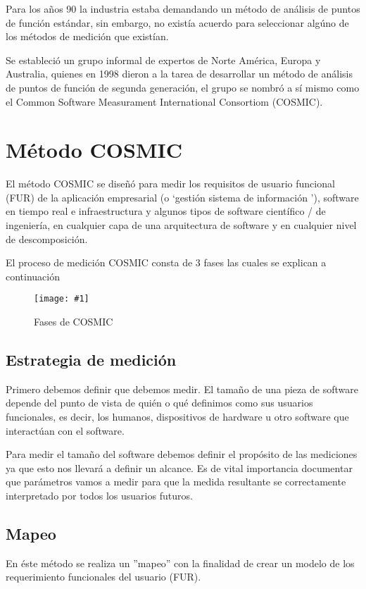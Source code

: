 \documentclass{mylib/reporteCorto}
\newcommand{\insertImage}[3]{
	\begin{figure}[H]
		\centering
		\texttt{[image: \#1]}
		\caption{#2}
	\end{figure}
}
\begin{document}
Para los años 90 la industria estaba demandando un método de análisis de puntos de función estándar, sin embargo, no existía acuerdo para seleccionar algúno de los métodos de medición que existían.

Se estableció un grupo informal de expertos de Norte América, Europa y Australia, quienes en 1998 dieron a la tarea de desarrollar un método de análisis de puntos de función de segunda generación, el grupo se nombró a sí mismo como el Common Software Measurament International Consortiom (COSMIC).

\section{Método COSMIC}

El método COSMIC se diseñó para medir los requisitos de usuario funcional (FUR) de la aplicación empresarial (o ‘gestión sistema de información '), software en tiempo real e infraestructura y algunos tipos de software científico / de ingeniería, en cualquier capa de una arquitectura de software y en cualquier nivel de descomposición.

El proceso de medición COSMIC consta de 3 fases las cuales se explican a continuación

\insertImage{img/admin/cosmic2}{Fases de COSMIC}{12}

\subsection{Estrategia de medición}

Primero debemos definir que debemos medir. El tamaño de una pieza de software depende del punto de vista de quién o qué definimos como sus usuarios funcionales, es decir, los humanos, dispositivos de hardware u otro software que interactúan con el software.

Para medir el tamaño del software debemos definir el propósito de las mediciones ya que esto nos llevará a definir un alcance. Es de vital importancia documentar que parámetros vamos a medir para que la medida resultante se correctamente interpretado por todos los usuarios futuros.

\subsection{Mapeo}

En éste método se realiza un ''mapeo'' con la finalidad de crear un modelo de los requerimiento funcionales del usuario (FUR).
\end{document}
